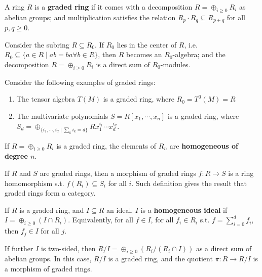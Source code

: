 \documentclass{article}
\begin{document}
\begin{definition}
    A ring $R$ is a \textbf{graded ring} if it comes with a decomposition $R = \oplus_{i \geq 0} R_i$ as abelian groups; and multiplication satisfies the relation $R_p \cdot R_q \subseteq R_{p + q}$ for all $p, q \geq 0$.
\end{definition}

\begin{remark}
    Consider the subring $R \subseteq R_0$. If $R_0$ lies in the center of $R$, i.e. $R_0 \subseteq \{a \in R \mid ab = ba \forall b \in R\}$, then $R$ becomes an $R_0$-algebra; and the decomposition $R = \oplus_{i \geq 0} R_i$ is a direct sum of $R_0$-modules.
\end{remark}

\begin{example}
    Consider the following examples of graded rings:
    \begin{enumerate}
        \item The tensor algebra $T(M)$ is a graded ring, where $R_0 = T^0(M) = R$
        \item The multivariate polynomials $S = R[x_1, \cdots, x_n]$ is a graded ring, where $S_d = \oplus_{\{i_1, \cdots, i_d \mid \sum_k i_k = d\}} R x_1^{i_1} \cdots x_d^{i_d}$.
    \end{enumerate}
\end{example}

\begin{definition}[Homogeneous]
    If $R = \oplus_{i \geq 0} R_i$ is a graded ring, the elements of $R_n$ are \textbf{homogeneous of degree $n$}.
\end{definition}

\begin{definition}
    If $R$ and $S$ are graded rings, then a morphism of graded rings $f: R \to S$ is a ring homomorphism s.t. $f(R_i) \subseteq S_i$ for all $i$. Such definition gives the result that graded rings form a category.
\end{definition}

\begin{definition}
    If $R$ is a graded ring, and $I \subseteq R$ an ideal. $I$ is a \textbf{homogeneous ideal} if $I = \oplus_{i \geq 0} (I \cap R_i)$. Equivalently, for all $f \in I$, for all $f_i \in R_i$ s.t. $f = \sum_{i=0}^d f_i$, then $f_j \in I$ for all $j$. 
\end{definition}

\begin{remark}
    If further $I$ is two-sided, then $R/I = \oplus_{i \geq 0}(R_i / (R_i \cap I))$ as a direct sum of abelian groups. In this case, $R/I$ is a graded ring, and the quotient $\pi: R \to R/I$ is a morphism of graded rings.
\end{remark}
\end{document}
